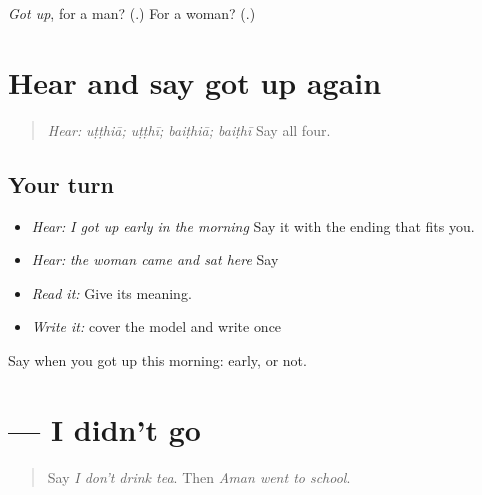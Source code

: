 \begin{tcolorbox}[breakable,colback=teal!4,colframe=teal!35!black,title={Before you move on}]
\emph{Got up}, for a man? (\textbf{}.) For a woman? (\textbf{}.)
\end{tcolorbox}
\section[\texorpdfstring{\pa{ਉੱਠਿਆ} · \pa{ਉੱਠੀ} … (uṭṭhiā · uṭṭhī …)}{ਉੱਠਿਆ · ਉੱਠੀ … (uṭṭhiā · uṭṭhī …)}]{Hear and say got up again}

\label{lesson:PA-C218-uthia-review}



\begin{quote}
\emph{Hear:} \emph{uṭṭhiā; uṭṭhī; baiṭhiā; baiṭhī} Say all four.
\end{quote}

\subsection*{Your turn}
\begin{itemize}
\raggedright
  \item \emph{Hear:} \emph{I got up early in the morning} Say it with the ending that fits you.
  \item \emph{Hear:} \emph{the woman came and sat here} Say \textbf{    }
  \item \emph{Read it:} \textbf{  } Give its meaning.
  \item \emph{Write it:} cover the model and write \textbf{} once
\end{itemize}

\begin{tcolorbox}[breakable,colback=teal!4,colframe=teal!35!black,title={Before you move on}]
Say when you got up this morning: early, or not.
\end{tcolorbox}
\section[\texorpdfstring{\pa{ਮੈਂ} \pa{ਨਹੀਂ} \pa{ਗਿਆ।} (maiṁ nahīṁ giā.)}{ਮੈਂ ਨਹੀਂ ਗਿਆ। (maiṁ nahīṁ giā.)}]{   — I didn't go}

\label{lesson:PA-C218-nahin-gia}



\begin{quote}
Say \emph{I don't drink tea}. Then \emph{Aman went to school}.
\end{quote}

